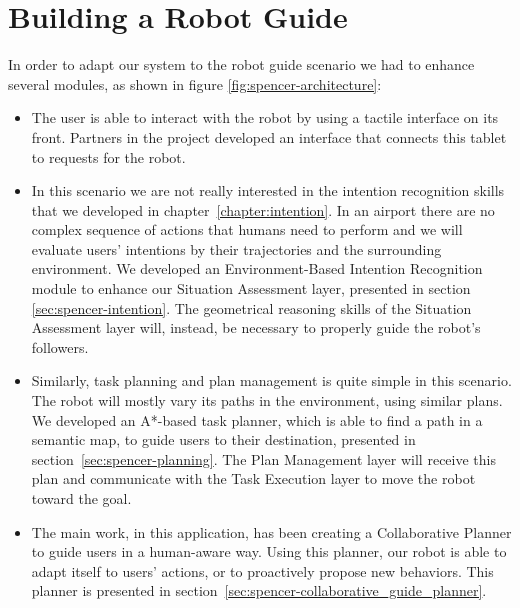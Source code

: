 \section{Building a Robot Guide}
\label{sec:spencer-robot_guide}
In order to adapt our system to the robot guide scenario we had to enhance several modules, as shown in figure \ref{fig:spencer-architecture}: 
\begin{itemize}
\item The user is able to interact with the robot by using a tactile interface on its front. Partners in the project developed an interface that connects this tablet to requests for the robot.
\item In this scenario we are not really interested in the intention recognition skills that we developed in chapter~\ref{chapter:intention}. In an airport there are no complex sequence of actions that humans need to perform and we will evaluate users' intentions by their trajectories and the surrounding environment. We developed an Environment-Based Intention Recognition module to enhance our Situation Assessment layer, presented in section \ref{sec:spencer-intention}. The geometrical reasoning skills of the Situation Assessment layer will, instead, be necessary to properly guide the robot's followers. 
\item Similarly, task planning and plan management is quite simple in this scenario. The robot will mostly vary its paths in the environment, using similar plans. We developed an A*-based task planner, which is able to find a path in a semantic map, to guide users to their destination, presented in section~\ref{sec:spencer-planning}. The Plan Management layer will receive this plan and communicate with the Task Execution layer to move the robot toward the goal.
\item The main work, in this application, has been creating a Collaborative Planner to guide users in a human-aware way. Using this planner, our robot is able to adapt itself to users' actions, or to proactively propose new behaviors. This planner is presented in section~\ref{sec:spencer-collaborative_guide_planner}.
\end{itemize} 

